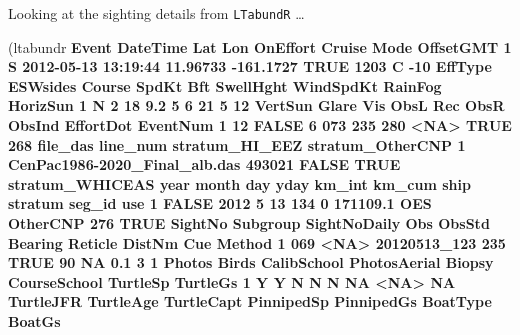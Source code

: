 \documentclass[
]{book}
\newenvironment{Shaded}{\begin{snugshade}}{\end{snugshade}}
\newcommand{\DecValTok}[1]{\textcolor[rgb]{0.00,0.00,0.81}{#1}}
\newcommand{\FloatTok}[1]{\textcolor[rgb]{0.00,0.00,0.81}{#1}}
\newcommand{\KeywordTok}[1]{\textcolor[rgb]{0.13,0.29,0.53}{\textbf{#1}}}
\newcommand{\NormalTok}[1]{#1}
\newcommand{\OperatorTok}[1]{\textcolor[rgb]{0.81,0.36,0.00}{\textbf{#1}}}
\newcommand{\OtherTok}[1]{\textcolor[rgb]{0.56,0.35,0.01}{#1}}
\newcommand{\StringTok}[1]{\textcolor[rgb]{0.31,0.60,0.02}{#1}}
\begin{document}
Looking at the sighting details from \texttt{LTabundR} \ldots{}

\begin{Shaded}
\begin{Highlighting}[]
\NormalTok{(ltabundr }\OperatorTok{%
\NormalTok{  Event            DateTime      Lat       Lon OnEffort Cruise Mode OffsetGMT}
\DecValTok{1}\NormalTok{     S }\DecValTok{2012-05-13} \DecValTok{13}\OperatorTok{:}\DecValTok{19}\OperatorTok{:}\DecValTok{44} \FloatTok{11.96733} \FloatTok{-161.1727}     \OtherTok{TRUE}   \DecValTok{1203}\NormalTok{    C       }\DecValTok{-10}
\NormalTok{  EffType ESWsides Course SpdKt Bft SwellHght WindSpdKt RainFog HorizSun}
\DecValTok{1}\NormalTok{       N        }\DecValTok{2}     \DecValTok{18}   \FloatTok{9.2}   \DecValTok{5}         \DecValTok{6}        \DecValTok{21}       \DecValTok{5}       \DecValTok{12}
\NormalTok{  VertSun Glare Vis ObsL Rec ObsR ObsInd EffortDot EventNum}
\DecValTok{1}      \DecValTok{12} \OtherTok{FALSE}   \DecValTok{6}  \DecValTok{073} \DecValTok{235}  \DecValTok{280}   \OperatorTok{<}\OtherTok{NA}\OperatorTok{>}\StringTok{      }\OtherTok{TRUE}      \DecValTok{268}
\NormalTok{                       file_das line_num stratum_HI_EEZ stratum_OtherCNP}
\DecValTok{1}\NormalTok{ CenPac1986}\DecValTok{-2020}\NormalTok{_Final_alb.das   }\DecValTok{493021}          \OtherTok{FALSE}             \OtherTok{TRUE}
\NormalTok{  stratum_WHICEAS year month day yday km_int   km_cum ship  stratum seg_id  use}
\DecValTok{1}           \OtherTok{FALSE} \DecValTok{2012}     \DecValTok{5}  \DecValTok{13}  \DecValTok{134}      \DecValTok{0} \FloatTok{171109.1}\NormalTok{  OES OtherCNP    }\DecValTok{276} \OtherTok{TRUE}
\NormalTok{  SightNo Subgroup SightNoDaily Obs ObsStd Bearing Reticle DistNm Cue Method}
\DecValTok{1}     \DecValTok{069}     \OperatorTok{<}\OtherTok{NA}\OperatorTok{>}\StringTok{ }\DecValTok{20120513}\NormalTok{_}\DecValTok{123} \DecValTok{235}   \OtherTok{TRUE}      \DecValTok{90}      \OtherTok{NA}    \FloatTok{0.1}   \DecValTok{3}      \DecValTok{1}
\NormalTok{  Photos Birds CalibSchool PhotosAerial Biopsy CourseSchool TurtleSp TurtleGs}
\DecValTok{1}\NormalTok{      Y     Y           N            N      N           }\OtherTok{NA}     \OperatorTok{<}\OtherTok{NA}\OperatorTok{>}\StringTok{       }\OtherTok{NA}
\NormalTok{  TurtleJFR TurtleAge TurtleCapt PinnipedSp PinnipedGs BoatType BoatGs}
}
\end{Highlighting}
\end{Shaded}
\end{document}
